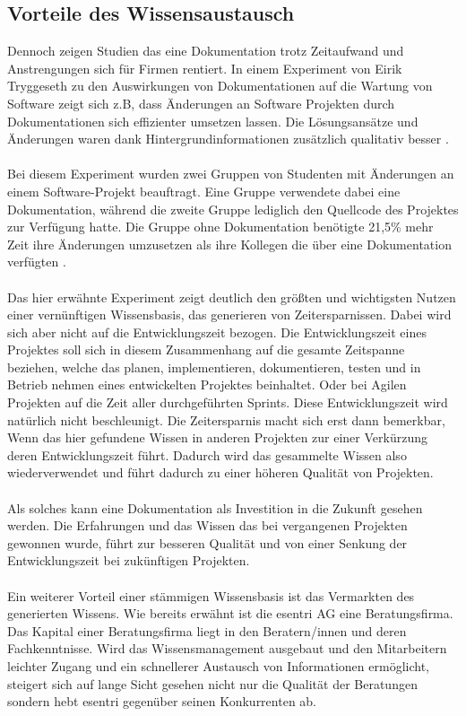 \documentclass[a4paper,12pt]{scrartcl}
\begin{document}
\subsection{Vorteile des Wissensaustausch}
\label{Zeitersparnis}
Dennoch zeigen Studien das eine Dokumentation trotz Zeitaufwand und Anstrengungen sich für Firmen rentiert. In einem Experiment von Eirik Tryggeseth zu den Auswirkungen von Dokumentationen auf die Wartung von Software zeigt sich z.B, dass Änderungen an Software Projekten durch Dokumentationen sich effizienter umsetzen lassen. Die Lösungsansätze und Änderungen waren dank Hintergrundinformationen zusätzlich qualitativ besser \cite{Tryggeseth1997}.
\\\\
Bei diesem Experiment wurden zwei Gruppen von Studenten mit Änderungen an einem Software-Projekt beauftragt. Eine Gruppe verwendete dabei eine Dokumentation, während die zweite Gruppe lediglich den Quellcode des Projektes zur Verfügung hatte. Die Gruppe ohne Dokumentation benötigte 21,5\% mehr Zeit ihre Änderungen umzusetzen als ihre Kollegen die über eine Dokumentation verfügten \cite{Tryggeseth1997}.
\\\\
Das hier erwähnte Experiment zeigt deutlich den größten und wichtigsten Nutzen einer vernünftigen Wissensbasis, das generieren von Zeitersparnissen. Dabei wird sich aber nicht auf die Entwicklungszeit bezogen. Die Entwicklungszeit eines Projektes soll sich in diesem Zusammenhang auf die gesamte Zeitspanne beziehen, welche das planen, implementieren, dokumentieren, testen und in Betrieb nehmen eines entwickelten Projektes beinhaltet. Oder bei Agilen Projekten auf die Zeit aller durchgeführten Sprints. Diese Entwicklungszeit wird natürlich nicht beschleunigt. Die Zeitersparnis macht sich erst dann bemerkbar, Wenn das hier gefundene Wissen in anderen Projekten zur einer Verkürzung deren Entwicklungszeit führt. Dadurch wird das gesammelte Wissen also wiederverwendet und führt dadurch zu einer höheren Qualität von Projekten.
\\\\
Als solches kann eine Dokumentation als Investition in die Zukunft gesehen werden. Die Erfahrungen und das Wissen das bei vergangenen Projekten gewonnen wurde, führt zur besseren Qualität und von einer Senkung der Entwicklungszeit bei zukünftigen Projekten.
\\\\
Ein weiterer Vorteil einer stämmigen Wissensbasis ist das Vermarkten des generierten Wissens. Wie bereits erwähnt ist die esentri AG eine Beratungsfirma. Das Kapital einer Beratungsfirma liegt in den Beratern/innen und deren Fachkenntnisse. Wird das Wissensmanagement ausgebaut und den Mitarbeitern leichter Zugang und ein schnellerer Austausch von Informationen ermöglicht, steigert sich auf lange Sicht gesehen nicht nur die Qualität der Beratungen sondern hebt esentri gegenüber seinen Konkurrenten ab.
\end{document}
